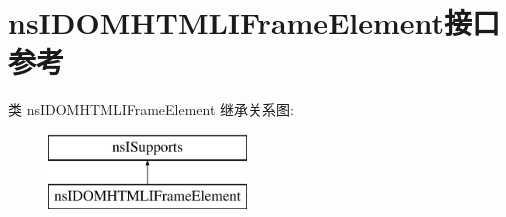 \hypertarget{interfacens_i_d_o_m_h_t_m_l_i_frame_element}{}\section{ns\+I\+D\+O\+M\+H\+T\+M\+L\+I\+Frame\+Element接口 参考}
\label{interfacens_i_d_o_m_h_t_m_l_i_frame_element}
类 ns\+I\+D\+O\+M\+H\+T\+M\+L\+I\+Frame\+Element 继承关系图\+:\begin{figure}[H]
\begin{center}
\leavevmode
\includegraphics[height=2.000000cm]{interfacens_i_d_o_m_h_t_m_l_i_frame_element}
\end{center}
\end{figure}
